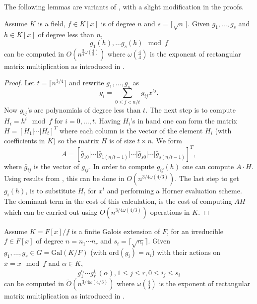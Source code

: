 \documentclass[sigconf]{acmart}
\newcommand{\osumcosttilde}{\tilde{O}(n^{3/4 \omega(4/3)})}
\theoremstyle{acmplain}
\begin{document}
The following lemmas are variants of \cite[Lemma 3 $\&$ Lemma 4]{Kaltofen}, with a slight modification in the proofs.

\begin{lemma}\cite{Kaltofen}\label{modcom}
Assume $K$ is a field, $f\in K[x]$ is of degree $n$ and $s = \lceil\sqrt{n}\rceil$. Given $g_1, \ldots , g_{s}$ and 
$h \in K[x]$ of degree less than $n$, $$g_1(h), \ldots g_{s}(h) \mod f$$ can be computed in
$O(n^{\frac{3}{4}\omega(\frac{4}{3})})$ where $\omega(\frac{4}{3})$ is the exponent of rectangular matrix 
multiplication as introduced in \cite{LeGall}. 
\end{lemma}

\begin{proof}
Let $t = \lceil n^{3/4} \rceil$ and rewrite $g_1 , \ldots , g_s$ as 
$$g_i = \sum_{0 \leq j < n/t} g_{ij}x^{tj}.$$
Now $g_{ij}$'s are polynomials of degree less than $t$. The next step is to compute $H_i = h^i \mod f$ for $i = 0 , \ldots , t$.
Having $H_i$'s in hand one can form the matrix $H = \left[ H_1 \vert \cdots \vert H_t \right]^T$ where each column is the vector of 
the element $H_i$ (with coefficients in $K$) so the matrix $H$ is of size $t \times n$. We form 
$$A = \left[\bar{g}_{10}\vert \cdots \vert \bar{g}_{1(n/t-1)}\vert \cdots \vert \bar{g}_{s0}\vert \cdots \vert \bar{g}_{s(n/t-1)}\right]^T,$$
where $\bar{g}_{ij}$ is the  vector of $g_{ij}$. In order to compute $g_{ij}(h)$ one can compute $A \cdot H$. Using 
results from \cite{LeGall}, this can be done in $O(n^{3/4 \omega(4/3)})$. The last step to get $g_i(h)$, is to substitute $H_t$ 
for $x^t$ and performing a Horner evaluation scheme. The dominant term in the cost of this calculation, is the cost of computing $AH$ which can be carried out using $O(n^{3/4 \omega(4/3)})$ operations in $K$.
\end{proof}

\begin{lemma}\cite{Kaltofen}\label{lem:selfcomp}
Assume $K = F[x]/f$ is a finite Galois extension of $F$, for an irreducible $f\in F[x]$ of degree $n = n_1 \cdots n_r$ and $s_i = \lceil\sqrt{n_i}\rceil$. Given $g_1, \ldots , g_{r} \in G = \mathrm{Gal}(K/F)$ (with $\mathrm{ord}(g_i) = n_i$) with their actions on 
$\bar{x}=x \mod f$ and $\alpha \in K$,
$$g_1^{i_1}\cdots g_r^{i_r}(\alpha) , 1 \leq j \leq r, 
0 \leq i_j \leq s_i$$ can be 
computed in $\osumcosttilde$ where $\omega(\frac{4}{3})$ is the exponent of rectangular matrix 
multiplication as introduced in \cite{LeGall}. 
\end{lemma}
\end{document}
